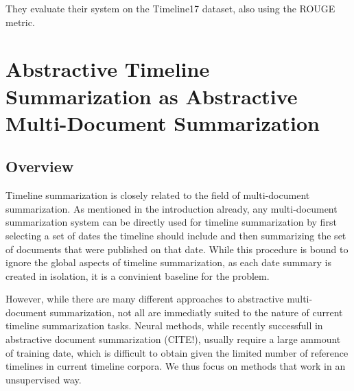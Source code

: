\documentclass[a4paper,BCOR=10mm]{report}
\begin{document}
They evaluate their system on the Timeline17 dataset, also using the ROUGE metric.








\chapter{Abstractive Timeline Summarization as Abstractive Multi-Document Summarization}

\section{Overview}

Timeline summarization is closely related to the field of multi-document summarization. As mentioned in the introduction already, any multi-document summarization system can be directly used for timeline summarization by first selecting a set of dates the timeline should include and then summarizing the set of documents that were published on that date.
While this procedure is bound to ignore the global aspects of timeline summarization, as each date summary is created in isolation, it is a convinient baseline for the problem.

However, while there are many different approaches to abstractive multi-document summarization, not all are immediatly suited to the nature of current timeline summarization tasks. Neural methods, while recently successfull in abstractive document summarization (CITE!), usually require a large ammount of training date, which is difficult to obtain given the limited number of reference timelines in current timeline corpora.
We thus focus on methods that work in an unsupervised way.
\end{document}
